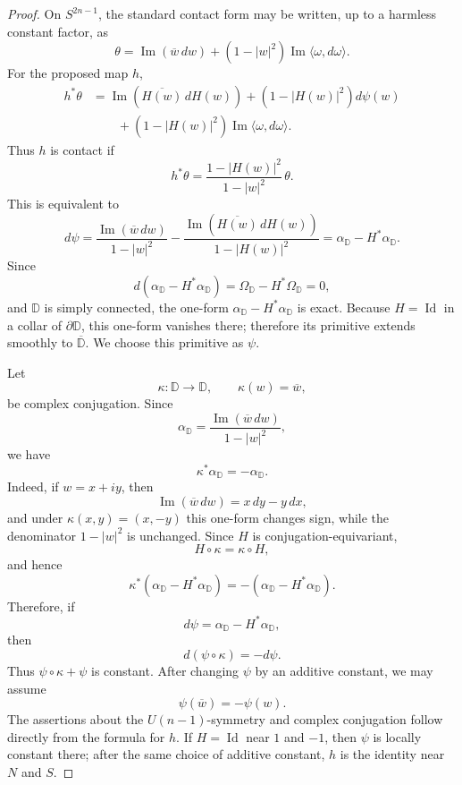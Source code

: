 \documentclass[11pt]{article}
\theoremstyle{definition}
\theoremstyle{remark}
\theoremstyle{definition}
\newcommand{\D}{\mathbb D}
\newcommand{\Id}{\operatorname{Id}}
\begin{document}
\begin{proof}
On \(S^{2n-1}\), the standard contact form may be written, up to a harmless
constant factor, as
\[
        \theta
        =
        \operatorname{Im}(\overline w\,dw)
        +
        (1-|w|^2)\operatorname{Im}\langle\omega,d\omega\rangle.
\]
For the proposed map \(h\),
\[
\begin{aligned}
        h^*\theta
        &=
        \operatorname{Im}(\overline{H(w)}\,dH(w))
        +
        (1-|H(w)|^2)d\psi(w)  \\
        &\qquad
        +
        (1-|H(w)|^2)\operatorname{Im}\langle\omega,d\omega\rangle.
\end{aligned}
\]
Thus \(h\) is contact if
\[
        h^*\theta
        =
        \frac{1-|H(w)|^2}{1-|w|^2}\,\theta.
\]
This is equivalent to
\[
        d\psi
        =
        \frac{\operatorname{Im}(\overline w\,dw)}{1-|w|^2}
        -
        \frac{\operatorname{Im}(\overline{H(w)}\,dH(w))}{1-|H(w)|^2}
        =
        \alpha_{\D}-H^*\alpha_{\D}.
\]
Since
\[
        d(\alpha_{\D}-H^*\alpha_{\D})
        =
        \Omega_{\D}-H^*\Omega_{\D}
        =
        0,
\]
and \(\D\) is simply connected, the one-form
\(\alpha_{\D}-H^*\alpha_{\D}\) is exact.  Because \(H=\Id\) in a collar of
\(\partial\D\), this one-form vanishes there; therefore its primitive extends
smoothly to \(\overline{\D}\).  We choose this primitive as \(\psi\).

Let
\[
        \kappa:\D\to\D,
        \qquad
        \kappa(w)=\overline w,
\]
be complex conjugation.  Since
\[
        \alpha_{\D}
        =
        \frac{\operatorname{Im}(\overline w\,dw)}{1-|w|^2},
\]
we have
\[
        \kappa^*\alpha_{\D}=-\alpha_{\D}.
\]
Indeed, if \(w=x+iy\), then
\[
        \operatorname{Im}(\overline w\,dw)=x\,dy-y\,dx,
\]
and under \(\kappa(x,y)=(x,-y)\) this one-form changes sign, while the
denominator \(1-|w|^2\) is unchanged.  Since \(H\) is
conjugation-equivariant,
\[
        H\circ\kappa=\kappa\circ H,
\]
and hence
\[
        \kappa^*(\alpha_{\D}-H^*\alpha_{\D})
        =
        -(\alpha_{\D}-H^*\alpha_{\D}).
\]
Therefore, if
\[
        d\psi=\alpha_{\D}-H^*\alpha_{\D},
\]
then
\[
        d(\psi\circ\kappa)=-d\psi.
\]
Thus \(\psi\circ\kappa+\psi\) is constant.  After changing \(\psi\) by an
additive constant, we may assume
\[
        \psi(\overline w)=-\psi(w).
\]
The assertions about the \(U(n-1)\)-symmetry and complex conjugation follow directly from the formula for \(h\).  If \(H=\Id\) near \(1\) and \(-1\), then
\(\psi\) is locally constant there; after the same choice of additive constant,
\(h\) is the identity near \(N\) and \(S\).
\end{proof}
\end{document}
